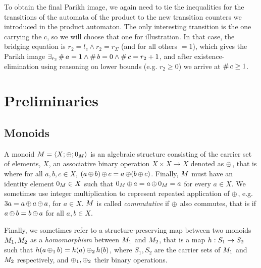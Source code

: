 \documentclass[acmsmall,review,anonymous,screen]{acmart}\settopmatter{printfolios=true,printccs=true,printacmref=true}
\theoremstyle{definition}
\begin{document}

To obtain the final Parikh image, we again need to tie the inequalities for the
transitions of the automata of the product to the new transition counters we
introduced in the product automaton. The only interesting transition is the one
carrying the c, so we will choose that one for illustration. In that case, the
bridging equation is $r_2 = l_c \land r_2 = r_{\Sigma}$ (and for all others
$=1$), which gives the Parikh image $\exists_{r_2} \operatorname{\#}{a} = 1 \land
\operatorname{\#}{b} = 0 \land \operatorname{\#}{c} = r_2 + 1$, and after
existence-elimination using reasoning on lower bounds (e.g. $r_2 \geq 0$) we
arrive at $\operatorname{\#}{c} \geq 1$.

\section{Preliminaries}

\subsection{Monoids}

A monoid $M = \left\langle X;\operatorname{\oplus};0_{M}\right\rangle$ is an algebraic structure
consisting of the carrier set of elements, $X$, an associative binary operation
$X \times X \rightarrow X$ denoted as $\operatorname{\oplus}$, that is where for all $a, b,
c \in X$, $(a \operatorname{\oplus} b) \operatorname{\oplus} c = a \operatorname{\oplus} (b \operatorname{\oplus} c)$. Finally,
$M$ must have an identity element $0_{M} \in X$ such that
$0_{M} \operatorname{\oplus} a = a \operatorname{\oplus} 0_{M} =   a$ for every $a \in X$.
We sometimes use integer multiplication to represent repeated application of
$\operatorname{\oplus}$, e.g. $3a = a \operatorname{\oplus} a \operatorname{\oplus} a$, for $a \in X$. $M$ is
called \textit{commutative} if $\operatorname{\oplus}$ also commutes, that is if $a
\operatorname{\oplus} b = b \operatorname{\oplus} a$ for all $a, b \in X$. 

Finally, we sometimes refer to a structure-preserving map between two monoids
$M_1, M_2$ as a \textit{homomorphism} between $M_1$ and
$M_2$, that is a map $h : S_1 \rightarrow S_2$ such that $h(a
\operatorname{\oplus}_1 b) = h(a) \operatorname{\oplus}_2 h(b)$, where $S_1, S_2$ are the carrier
sets of $M_1$ and $M_2$ respectively, and $\operatorname{\oplus}_1, \operatorname{\oplus}_2$
their binary operations.
\end{document}

